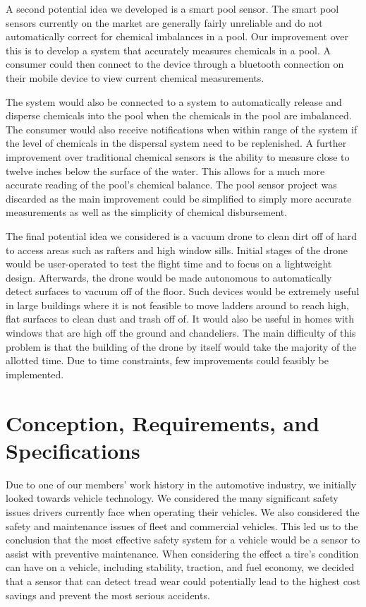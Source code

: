 \documentclass[11pt]{IEEEtran}
\begin{document}
		A second potential idea we developed is a smart pool sensor. The smart pool sensors currently on the market are generally fairly unreliable and do not automatically correct for chemical imbalances in a pool. Our improvement over this is to develop a system that accurately measures chemicals in a pool. A consumer could then connect to the device through a bluetooth connection on their mobile device to view current chemical measurements. 

		The system would also be connected to a system to automatically release and disperse chemicals into the pool when the chemicals in the pool are imbalanced. The consumer would also receive notifications when within range of the system if the level of chemicals in the dispersal system need to be replenished. A further improvement over traditional chemical sensors is the ability to measure close to twelve inches below the surface of the water. This allows for a much more accurate reading of the pool’s chemical balance. The pool sensor project was discarded as the main improvement could be simplified to simply more accurate measurements as well as the simplicity of chemical disbursement. 

		The final potential idea we considered is a vacuum drone to clean dirt off of hard to access areas such as rafters and high window sills. Initial stages of the drone would be user-operated to test the flight time and to focus on a lightweight design. Afterwards, the drone would be made autonomous to automatically detect surfaces to vacuum off of the floor. Such devices would be extremely useful in large buildings where it is not feasible to move ladders around to reach high, flat surfaces to clean dust and trash off of. It would also be useful in homes with windows that are high off the ground and chandeliers. The main difficulty of this problem is that the building of the drone by itself would take the majority of the allotted time. Due to time constraints, few improvements could feasibly be implemented. 


	\section{Conception, Requirements, and Specifications}
		Due to one of our members’ work history in the automotive industry, we initially looked towards vehicle technology. We considered the many significant safety issues drivers currently face when operating their vehicles. We also considered the safety and maintenance issues of fleet and commercial vehicles. This led us to the conclusion that the most effective safety system for a vehicle would be a sensor to assist with preventive maintenance. When considering the effect a tire’s condition can have on a vehicle, including stability, traction, and fuel economy, we decided that a sensor that can detect tread wear could potentially lead to the highest cost savings and prevent the most serious accidents.
\end{document}
